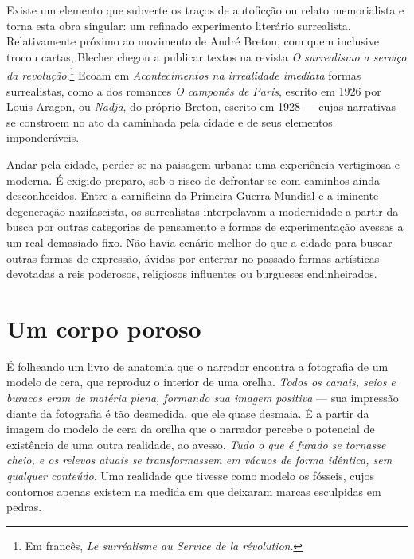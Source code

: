 Existe um elemento que subverte os traços de autoficção ou relato memorialista e torna esta obra singular: um refinado experimento literário surrealista. Relativamente próximo ao movimento de André Breton, com quem inclusive trocou cartas, Blecher chegou a publicar textos na revista \textit{O surrealismo a serviço da revolução}.\footnote{Em francês, \textit{Le surréalisme au Service de la révolution}.} Ecoam em \textit{Acontecimentos na irrealidade imediata} formas surrealistas, como a dos romances \textit{O camponês de Paris}, escrito em 1926 por Louis Aragon, ou \textit{Nadja}, do próprio Breton, escrito em 1928 --- cujas narrativas se constroem no ato da caminhada pela cidade e de seus elementos imponderáveis.


Andar pela cidade, perder-se na paisagem urbana: uma experiência vertiginosa e moderna. É exigido preparo, sob o risco de defrontar-se com caminhos ainda desconhecidos. Entre a carnificina da Primeira Guerra Mundial e a iminente degeneração nazifascista, os surrealistas interpelavam a modernidade a partir da busca por outras categorias de pensamento e formas de experimentação avessas a um real demasiado fixo. Não havia cenário melhor do que a cidade para buscar outras formas de expressão, ávidas por enterrar no passado formas artísticas devotadas a reis poderosos, religiosos influentes ou burgueses endinheirados.

\section{Um corpo poroso}

É folheando um livro de anatomia que o narrador encontra a fotografia de um modelo de cera, que reproduz o interior de uma orelha. \textit{Todos os canais, seios e buracos eram de matéria plena, formando sua imagem positiva} --- sua impressão diante da fotografia é tão desmedida, que ele quase desmaia. É a partir da imagem do modelo de cera da orelha que o narrador percebe o potencial de existência de uma outra realidade, ao avesso. \textit{Tudo o que é furado se tornasse cheio, e os relevos atuais se transformassem em vácuos de forma idêntica, sem qualquer conteúdo}. Uma realidade que tivesse como modelo os fósseis, cujos contornos apenas existem na medida em que deixaram marcas esculpidas em pedras.

